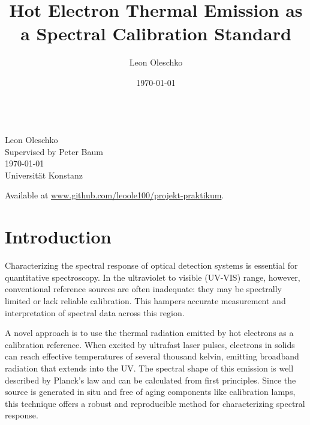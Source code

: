 \documentclass[
	parskip=half,
	a4paper,
]{scrarticle}
\begin{document}
\title{Hot Electron Thermal Emission as a Spectral Calibration Standard}
\author{Leon Oleschko}
\date{\dotdate\today}

\begin{titlepage}
    \sffamily
    \vspace*{3cm}
    {
        \fontsize{32}{32}
    }
    \vspace{.25cm}\\
    {
        \Large
        Leon Oleschko\\
        Supervised by Peter Baum
        \vspace{.05cm}\\
        \dotdate\today\\
        Universität Konstanz
    }
    \vfill
    {
        \normalfont\normalsize

    }
    \vfill
    \begin{flushright}
        Available at \url{www.github.com/leoole100/projekt-praktikum}.
    \end{flushright}
\end{titlepage}


\clearpage
\section{Introduction}
Characterizing the spectral response of optical detection systems is essential for quantitative spectroscopy. In the ultraviolet to visible (UV-VIS) range, however, conventional reference sources are often inadequate: they may be spectrally limited or lack reliable calibration. This hampers accurate measurement and interpretation of spectral data across this region.

A novel approach is to use the thermal radiation emitted by hot electrons as a calibration reference. When excited by ultrafast laser pulses, electrons in solids can reach effective temperatures of several thousand kelvin, emitting broadband radiation that extends into the UV. The spectral shape of this emission is well described by Planck’s law and can be calculated from first principles. Since the source is generated in situ and free of aging components like calibration lamps, this technique offers a robust and reproducible method for characterizing spectral response.
\end{document}
